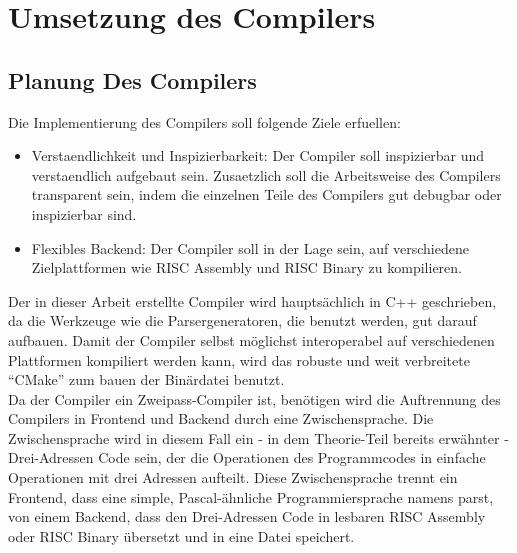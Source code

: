 \part{Umsetzung des Compilers}
\chapter{Planung Des Compilers}

Die Implementierung des Compilers soll folgende Ziele erfuellen:

\begin{itemize}
\item Verstaendlichkeit und Inspizierbarkeit: Der Compiler soll inspizierbar und verstaendlich aufgebaut sein. Zusaetzlich soll die Arbeitsweise des Compilers transparent sein, indem die einzelnen Teile des Compilers gut debugbar oder inspizierbar sind.
\item Flexibles Backend: Der Compiler soll in der Lage sein, auf verschiedene Zielplattformen wie RISC Assembly und RISC Binary zu kompilieren.
\end{itemize}

Der in dieser Arbeit erstellte Compiler  wird hauptsächlich in C++ geschrieben, da die Werkzeuge wie die Parsergeneratoren, die benutzt werden, gut darauf aufbauen.
Damit der Compiler selbst möglichst interoperabel auf verschiedenen Plattformen kompiliert werden kann, wird das robuste und weit verbreitete ``CMake'' zum bauen der Binärdatei benutzt.\\
Da der Compiler ein Zweipass-Compiler ist, benötigen wird die Auftrennung des Compilers in Frontend und Backend durch eine Zwischensprache.
Die Zwischensprache wird in diesem Fall ein - in dem Theorie-Teil bereits erwähnter - Drei-Adressen Code sein, der die Operationen des Programmcodes in einfache Operationen mit drei Adressen aufteilt.
Diese Zwischensprache trennt ein Frontend, dass eine simple, Pascal-ähnliche Programmiersprache namens  parst, von einem Backend, dass den Drei-Adressen Code in lesbaren RISC Assembly oder RISC Binary übersetzt und in eine Datei speichert.\\

